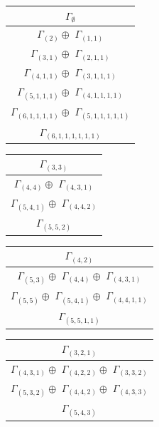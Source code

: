 \documentclass[main.tex]{subfiles}
\begin{document}
\begin{minipage}{.3\textwidth}
\centering
\begin{tabular}{c}
$\Gamma_\emptyset$
\\ \hline
$\Gamma_{(
2
)} \oplus$
$\Gamma_{(
1 , 
1
)}$
\\ \hline
$\Gamma_{(
3 , 
1
)} \oplus$
$\Gamma_{(
2 , 
1 , 
1
)}$
\\ \hline
$\Gamma_{(
4 , 
1 , 
1
)} \oplus$
$\Gamma_{(
3 , 
1 , 
1 , 
1
)}$
\\ \hline
$\Gamma_{(
5 , 
1 , 
1 , 
1
)} \oplus$
$\Gamma_{(
4 , 
1 , 
1 , 
1 , 
1
)}$
\\ \hline
$\Gamma_{(
6 , 
1 , 
1 , 
1 , 
1
)} \oplus$
$\Gamma_{(
5 , 
1 , 
1 , 
1 , 
1 , 
1
)}$
\\ \hline
$\Gamma_{(
6 , 
1 , 
1 , 
1 , 
1 , 
1 , 
1
)}$
\\
\end{tabular}\end{minipage}
\begin{minipage}{.2\textwidth}
\centering
\begin{tabular}{c}
$\Gamma_{(
3 , 
3
)}$
\\ \hline
$\Gamma_{(
4 , 
4
)} \oplus$
$\Gamma_{(
4 , 
3 , 
1
)}$
\\ \hline
$\Gamma_{(
5 , 
4 , 
1
)} \oplus$
$\Gamma_{(
4 , 
4 , 
2
)}$
\\ \hline
$\Gamma_{(
5 , 
5 , 
2
)}$
\\
\end{tabular}\end{minipage}
\bigskip
\begin{minipage}{.5\textwidth}
\centering
\begin{tabular}{c}
$\Gamma_{(
4 , 
2
)}$
\\ \hline
$\Gamma_{(
5 , 
3
)} \oplus$
$\Gamma_{(
4 , 
4
)} \oplus$
$\Gamma_{(
4 , 
3 , 
1
)}$
\\ \hline
$\Gamma_{(
5 , 
5
)} \oplus$
$\Gamma_{(
5 , 
4 , 
1
)} \oplus$
$\Gamma_{(
4 , 
4 , 
1 , 
1
)}$
\\ \hline
$\Gamma_{(
5 , 
5 , 
1 , 
1
)}$
\\
\end{tabular}\end{minipage}
\begin{minipage}{.5\textwidth}
\centering
\begin{tabular}{c}
$\Gamma_{(
3 , 
2 , 
1
)}$
\\ \hline
$\Gamma_{(
4 , 
3 , 
1
)} \oplus$
$\Gamma_{(
4 , 
2 , 
2
)} \oplus$
$\Gamma_{(
3 , 
3 , 
2
)}$
\\ \hline
$\Gamma_{(
5 , 
3 , 
2
)} \oplus$
$\Gamma_{(
4 , 
4 , 
2
)} \oplus$
$\Gamma_{(
4 , 
3 , 
3
)}$
\\ \hline
$\Gamma_{(
5 , 
4 , 
3
)}$
\\
\end{tabular}\end{minipage}
\end{document}
